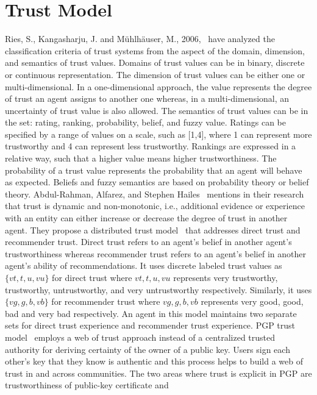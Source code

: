 \section{Trust Model}
Ries, S., Kangasharju, J. and Mühlhäuser, M.,
2006,~\cite{ries2006classification} have analyzed the classification criteria
of trust systems from the aspect of the domain, dimension, and semantics of
trust values. Domains of trust values can be in binary, discrete or continuous
representation. The dimension of trust values can be either one or
multi-dimensional. In a one-dimensional approach, the value represents the
degree of trust an agent assigns to another one whereas, in a
multi-dimensional, an uncertainty of trust value is also allowed. The semantics
of trust values can be in the set: rating, ranking, probability, belief, and
fuzzy value. Ratings can be specified by a range of values on a scale, such as
[1,4], where 1 can represent more trustworthy and 4 can represent less
trustworthy. Rankings are expressed in a relative way, such that a higher value
means higher trustworthiness. The probability of a trust value represents the
probability that an agent will behave as expected. Beliefs and fuzzy semantics
are based on probability theory or belief theory.  Abdul-Rahman, Alfarez, and
Stephen Hailes~\cite{abdul2000supporting} mentions in their research that trust
is dynamic and non-monotonic, i.e., additional evidence or experience with an
entity can either increase or decrease the degree of trust in another agent.
They propose a distributed trust model~\cite{abdul1998distributed} that
addresses direct trust and recommender trust. Direct trust refers to an agent's
belief in another agent's trustworthiness whereas recommender trust refers to
an agent's belief in another agent's ability of recommendations. It uses
discrete labeled trust values as $\{vt, t, u, vu\}$ for direct trust where
$vt,t,u,vu$ represents very trustworthy, trustworthy, untrustworthy, and very
untrustworthy respectively. Similarly, it uses $\{vg, g, b, vb\}$ for
recommender trust where $vg, g, b, vb$ represents very good, good, bad and
very bad respectively. An agent in this model maintains two separate sets for
direct trust experience and recommender trust experience. PGP trust
model~\cite{abdul1997pgp} employs a web of trust approach instead of a
centralized trusted authority for deriving certainty of the owner of a public
key. Users sign each other's key that they know is authentic and this process
helps to build a web of trust in and across communities. The two areas where
trust is explicit in PGP are trustworthiness of public-key certificate and
